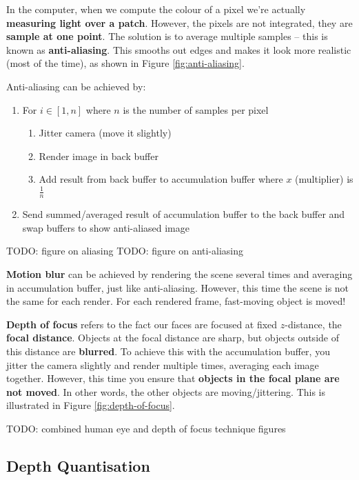 \documentclass{article}
\begin{document}
In the computer, when we compute the colour of a pixel we're actually \textbf{measuring light over a patch}. However, the pixels are not integrated, they are \textbf{sample at one point}. The solution is to average multiple samples -- this is known as \textbf{anti-aliasing}. This smooths out edges and makes it look more realistic (most of the time), as shown in Figure \ref{fig:anti-aliasing}.

Anti-aliasing can be achieved by:
\begin{enumerate}
	\item For $i \in [1,n]$ where $n$ is the number of samples per pixel
	\begin{enumerate}
		\item Jitter camera (move it slightly)
		\item Render image in back buffer 
		\item Add result from back buffer to accumulation buffer where $x$ (multiplier) is $\frac{1}{n}$
	\end{enumerate}
	\item Send summed/averaged result of accumulation buffer to the back buffer and swap buffers to show anti-aliased image
\end{enumerate}

TODO: figure on aliasing
TODO: figure on anti-aliasing

\textbf{Motion blur} can be achieved by rendering the scene several times and averaging in accumulation buffer, just like anti-aliasing. However, this time the scene is not the same for each render. For each rendered frame, fast-moving object is moved!

\textbf{Depth of focus} refers to the fact our faces are focused at fixed $z$-distance, the  \textbf{focal distance}. Objects at the focal distance are sharp, but objects outside of this distance are \textbf{blurred}. To achieve this with the accumulation buffer, you jitter the camera slightly and render multiple times, averaging each image together. However, this time you ensure that \textbf{objects in the focal plane are not moved}. In other words, the other objects are moving/jittering. This is illustrated in Figure \ref{fig:depth-of-focus}.

TODO: combined human eye and depth of focus technique figures

\subsection{Depth Quantisation}
\end{document}

